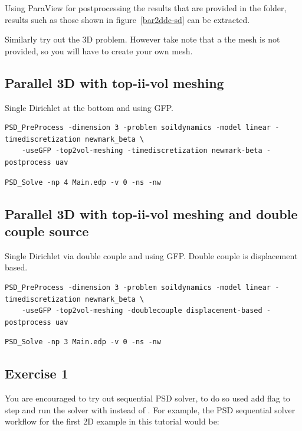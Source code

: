 {{Using ParaView for postprocessing the results that are provided in the  folder, results such as those shown in figure~\ref{bar2ddc-sd} can be extracted.

Similarly try out the 3D problem. However take note that a the mesh  is not provided, so you will have to create your own mesh. 


\subsection{Parallel 3D with top-ii-vol meshing}

Single Dirichlet at the bottom and using GFP.

\begin{lstlisting}[style=BashInputStyle]
	PSD_PreProcess -dimension 3 -problem soildynamics -model linear -timediscretization newmark_beta \
	-useGFP -top2vol-meshing -timediscretization newmark-beta -postprocess uav
\end{lstlisting}

\begin{lstlisting}[style=BashInputStyle]
	PSD_Solve -np 4 Main.edp -v 0 -ns -nw 
\end{lstlisting}


\subsection{Parallel 3D with top-ii-vol meshing and double couple source}

Single Dirichlet via double couple and using GFP. Double couple is displacement based. 

\begin{lstlisting}[style=BashInputStyle]
	PSD_PreProcess -dimension 3 -problem soildynamics -model linear -timediscretization newmark_beta \
	-useGFP -top2vol-meshing -doublecouple displacement-based -postprocess uav
\end{lstlisting}

\begin{lstlisting}[style=BashInputStyle]
	PSD_Solve -np 3 Main.edp -v 0 -ns -nw 
\end{lstlisting}

\subsection{Exercise  1}

You are encouraged to try out sequential PSD solver, to do so used add  flag to  step and run the solver with  instead of . For example, the PSD sequential solver workflow for the first 2D example in this tutorial would be:

}}
